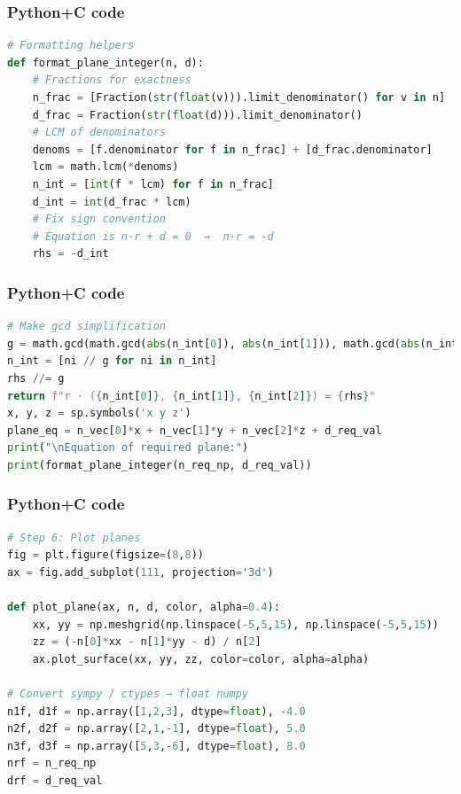 \documentclass{beamer}
\begin{document}
\begin{frame}[fragile]
    \frametitle{Python+C code}

    \begin{lstlisting}[language=Python]
# Formatting helpers
def format_plane_integer(n, d):
    # Fractions for exactness
    n_frac = [Fraction(str(float(v))).limit_denominator() for v in n]
    d_frac = Fraction(str(float(d))).limit_denominator()
    # LCM of denominators
    denoms = [f.denominator for f in n_frac] + [d_frac.denominator]
    lcm = math.lcm(*denoms)
    n_int = [int(f * lcm) for f in n_frac]
    d_int = int(d_frac * lcm)
    # Fix sign convention 
    # Equation is n·r + d = 0  →  n·r = -d
    rhs = -d_int

    \end{lstlisting}
\end{frame}

\begin{frame}[fragile]
    \frametitle{Python+C code}

    \begin{lstlisting}[language=Python]
# Make gcd simplification
g = math.gcd(math.gcd(abs(n_int[0]), abs(n_int[1])), math.gcd(abs(n_int[2]), abs(rhs)))
n_int = [ni // g for ni in n_int]
rhs //= g
return f"r · ({n_int[0]}, {n_int[1]}, {n_int[2]}) = {rhs}"
x, y, z = sp.symbols('x y z')
plane_eq = n_vec[0]*x + n_vec[1]*y + n_vec[2]*z + d_req_val
print("\nEquation of required plane:")
print(format_plane_integer(n_req_np, d_req_val))
    \end{lstlisting}
    
\end{frame}

\begin{frame}[fragile]
    \frametitle{Python+C code}

    \begin{lstlisting}[language=Python]
# Step 6: Plot planes
fig = plt.figure(figsize=(8,8))
ax = fig.add_subplot(111, projection='3d')

def plot_plane(ax, n, d, color, alpha=0.4):
    xx, yy = np.meshgrid(np.linspace(-5,5,15), np.linspace(-5,5,15))
    zz = (-n[0]*xx - n[1]*yy - d) / n[2]
    ax.plot_surface(xx, yy, zz, color=color, alpha=alpha)
    
# Convert sympy / ctypes → float numpy
n1f, d1f = np.array([1,2,3], dtype=float), -4.0
n2f, d2f = np.array([2,1,-1], dtype=float), 5.0
n3f, d3f = np.array([5,3,-6], dtype=float), 8.0
nrf = n_req_np
drf = d_req_val


    \end{lstlisting}
    
\end{frame}
\end{document}
